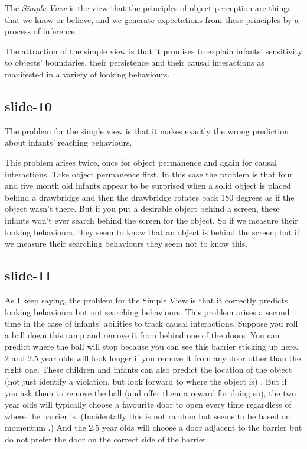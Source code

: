 \documentclass[12pt,\papersize]{extarticle}
\begin{document}
The \emph{Simple View} is the view that the principles of object perception are things that we know or believe, and we generate expectations from these principles by a process of inference.
 
The attraction of the simple view is that it promises to explain infants' sensitivity to 
objects' boundaries, their persistence and their causal interactions as manifested in a variety 
of looking behaviours.
 
\subsection{slide-10}
The problem for the simple view is that it makes exactly the wrong prediction about infants' 
reaching behaviours.
 
This problem arises twice, once for object permanence and again for causal interactions.
Take object permanence first.  In this case the problem is 
that four and five month old infants appear to be surprised when a solid object is placed 
behind a drawbridge 
and then the drawbridge rotates back 180 degrees as if the object wasn't there.  
But if you put a desirable object behind a screen, these infants won't ever search behind the 
screen for the object. 
So if we measure their looking behaviours, they seem to know that an object is behind the 
screen; but if we measure their searching behaviours they seem not to know this.
 
\subsection{slide-11}
As I keep saying, 
the problem for the Simple View is that it correctly predicts looking behaviours but not 
searching behaviours.
This problem arises a second time in the case of infants' abilities to track causal 
interactions.
Suppose you roll a ball down this ramp and remove it from behind one of the doors.
You can predict where the ball will stop because you can see this barrier sticking up here.
2 and 2.5 year olds will look longer if you remove it from any door other than the right one.
These children and infants can also predict the location of the object (not just identify a 
violation, but look forward to where the object is) \citep{mash:2006_what}.
But if you ask them to remove the ball (and offer them a reward for doing so), 
the two year olds will typically choose a favourite door to open every time regardless of where 
the barrier is.  
(Incidentally this is not random but seems to be based on momentum 
\citep{perry:2008_representational}.) 
And the 2.5 year olds will choose a door adjacent to the barrier but do not prefer the door on 
the correct side of the barrier.
 
\end{document}
